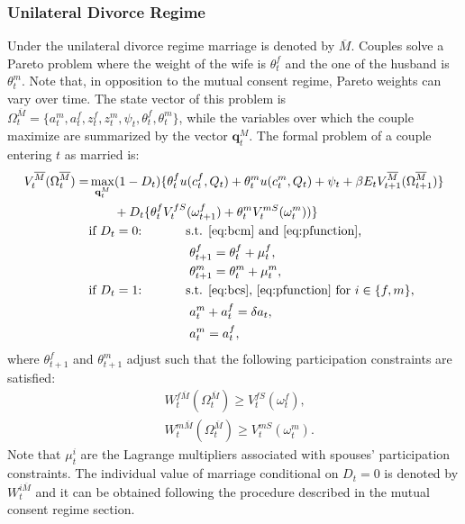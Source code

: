 \documentclass[12pt]{article}
\numberwithin{table}{section}
\begin{document}
\subsubsection*{Unilateral Divorce Regime}
Under the unilateral divorce regime marriage is denoted by $\overline{M}$. Couples solve a Pareto problem where the weight of the wife is $\theta^f_t$ and the one of the husband is $\theta^m_t$. Note that, in opposition to the mutual consent regime, Pareto weights can vary over time. The state vector of this problem is $\Omega^{\overline{M}}_t=\{a^m_t,a^f_t,z^f_t,z^m_t,\psi_t,\theta^f_t,\theta^m_t\}$, while the variables over which the couple maximize are summarized by the vector $\mathbf{q}^M_t$. The formal problem of a couple entering $t$ as married is:
\begin{equation}\label{eq:v_uni}
\begin{split}
V_t^{\overline{M}}(\Omega^{\overline{M}}_t)=&\max_{\mathbf{q}^M_t} (1-D_t)\{\theta^f_{t} u(c^f_t,Q_t)+\theta^m_{t} u(c^m_t,Q_t)+\psi_t+\beta E_t V^{\overline{M}}_{t+1}(\Omega^{\overline{M}}_{t+1})\}\\ &\quad\quad+D_t \{\theta^f_{t}V^{fS}_{t}(\omega^{f}_{t+1})+\theta^m_{t} V^{mS}_{t}(\omega^{m}_{t}))\}
\\ &\text{if $D_t=0$:}\hspace{35pt}\text{s.t. \eqref{eq:bcm} and \eqref{eq:pfunction},}\\ &\hspace{80pt}
\theta^f_{t+1}=\theta^f_{t}+\mu^f_t,\\ &\hspace{80pt}
\theta^m_{t+1}=\theta^m_{t}+\mu^m_t,
\\ &\text{if $D_t=1$:}\hspace{35pt}\text{s.t. \eqref{eq:bcs}, \eqref{eq:pfunction} for $i\in\{f,m\}$,}\\ &
\hspace{80pt}a_t^m+a_t^f=\delta a_t,	\\ &
\hspace{80pt}a_t^m=a_t^f,
\end{split}
\end{equation}
where $\theta^f_{t+1}$ and $\theta^m_{t+1}$ adjust such that the following participation constraints are satisfied:
\begin{equation}\label{eq:p_cons_mar}
\begin{split}
&
W^{f\overline{M}}_{t}(\Omega^{\overline{M}}_{t})\geq V_{t}^{fS}(\omega^f_{t}),\\ &
W^{m\overline{M}}_{t}(\Omega^{\overline{M}}_{t})\geq V_{t}^{mS}(\omega^m_{t}). 
\end{split}
\end{equation}
Note that $\mu^i_t$ are the Lagrange multipliers associated with spouses' participation constraints. The individual value of marriage conditional on $D_t=0$ is denoted by $W_{t}^{i\overline{M}}$ and it can be obtained following the procedure described in the mutual consent regime section. 
\end{document}
